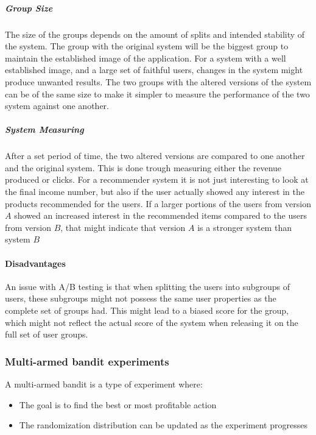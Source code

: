 \subparagraph{Group Size} %
\label{par:group_size}

The size of the groups depends on the amount of splits and intended stability
of the system.  The group with the original system will be the biggest group to
maintain the established image of the application.  For a system with a well
established image, and a large set of faithful users, changes in the system
might produce unwanted results.  The two groups with the altered versions of
the system can be of the same size to make it simpler to measure the
performance of the two system against one another.

\subparagraph{System Measuring} %
\label{par:system_measuring}

After a set period of time, the two altered versions are compared to one
another and the original system.  This is done trough measuring either the
revenue produced or clicks.  For a recommender system it is not just
interesting to look at the final income number, but also if the user actually
showed any interest in the products recommended for the users.  If a larger
portions of the users from version $A$ showed an increased interest in the
recommended items compared to the users from version $B$, that might indicate
that version $A$ is a stronger system than system $B$

\paragraph{Disadvantages}

An issue with A/B testing is that when splitting the users into subgroups of
users, these subgroups might not possess the same user properties as the
complete set of groups had.  This might lead to a biased score for the group,
which might not reflect the actual score of the system when releasing it on the
full set of user groups.


\subsubsection{Multi-armed bandit experiments \cite{googlebandit}}

A multi-armed bandit is a type of experiment where:

\begin{itemize}
	\item The goal is to find the best or most profitable action
	\item The randomization distribution can be updated as the experiment progresses
\end{itemize}

